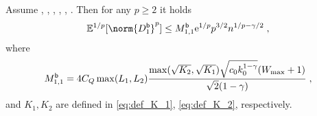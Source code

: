 \label{sec: Dboot bounds}
\begin{lemma}
\label{lem:bound_p_moment_martingale_components}
Assume , , , , , . Then for any $p\geq 2$ it holds
\begin{equation}
    \PE^{1/p}[\norm{D^\boot_{1}}^p]\leq M_{1,1}^{\boot}\rme^{1/p}p^{3/2}n^{1/p-\gamma/2} \eqsp, 
\end{equation}
where 
\begin{equation}
    M_{1,1}^{\mathsf{b}} = 4C_Q\max(L_1,L_2)\frac{\max(\sqrt{K_2},\sqrt{K_1})\sqrt{c_0k_0^{1-\gamma}}(W_{\max}+1)}{\sqrt{2}(1-\gamma)}\;,
\end{equation}
and $K_1, K_2$ are defined in \eqref{eq:def_K_1}, \eqref{eq:def_K_2}, respectively.
\end{lemma}
